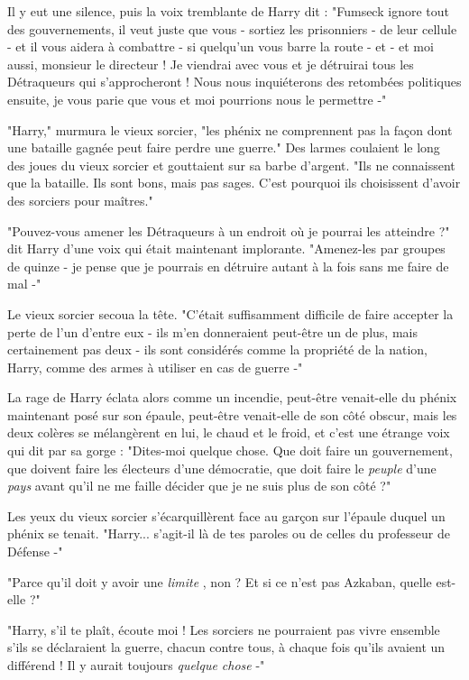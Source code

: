 Il y eut une silence, puis la voix tremblante de Harry dit : "Fumseck ignore tout des gouvernements, il veut juste que vous - sortiez les prisonniers - de leur cellule - et il vous aidera à combattre - si quelqu'un vous barre la route - et - et moi aussi, monsieur le directeur ! Je viendrai avec vous et je détruirai tous les Détraqueurs qui s'approcheront ! Nous nous inquiéterons des retombées politiques ensuite, je vous parie que vous et moi pourrions nous le permettre -"

"Harry," murmura le vieux sorcier, "les phénix ne comprennent pas la façon dont une bataille gagnée peut faire perdre une guerre." Des larmes coulaient le long des joues du vieux sorcier et gouttaient sur sa barbe d'argent. "Ils ne connaissent que la bataille. Ils sont bons, mais pas sages. C'est pourquoi ils choisissent d'avoir des sorciers pour maîtres."

"Pouvez-vous amener les Détraqueurs à un endroit où je pourrai les atteindre ?" dit Harry d'une voix qui était maintenant implorante. "Amenez-les par groupes de quinze - je pense que je pourrais en détruire autant à la fois sans me faire de mal -"

Le vieux sorcier secoua la tête. "C'était suffisamment difficile de faire accepter la perte de l'un d'entre eux - ils m'en donneraient peut-être un de plus, mais certainement pas deux - ils sont considérés comme la propriété de la nation, Harry, comme des armes à utiliser en cas de guerre -"

La rage de Harry éclata alors comme un incendie, peut-être venait-elle du phénix maintenant posé sur son épaule, peut-être venait-elle de son côté obscur, mais les deux colères se mélangèrent en lui, le chaud et le froid, et c'est une étrange voix qui dit par sa gorge : "Dites-moi quelque chose. Que doit faire un gouvernement, que doivent faire les électeurs d'une démocratie, que doit faire le \emph{peuple}  d'une \emph{pays}  avant qu'il ne me faille décider que je ne suis plus de son côté ?"

Les yeux du vieux sorcier s'écarquillèrent face au garçon sur l'épaule duquel un phénix se tenait. "Harry... s'agit-il là de tes paroles ou de celles du professeur de Défense -"

"Parce qu'il doit y avoir une \emph{limite} , non ? Et si ce n'est pas Azkaban, quelle est-elle ?"

"Harry, s'il te plaît, écoute moi ! Les sorciers ne pourraient pas vivre ensemble s'ils se déclaraient la guerre, chacun contre tous, à chaque fois qu'ils avaient un différend ! Il y aurait toujours \emph{quelque chose}  -"

